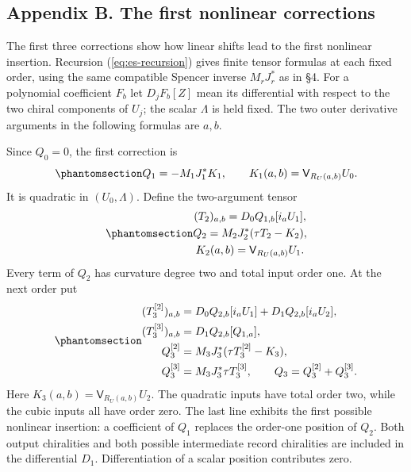 \documentclass[
  english,
  11pt,
  reqno]{amsart}
\begin{document}
\subsection{Appendix B. The first nonlinear
corrections}\label{appendix-b.-the-first-nonlinear-corrections}

The first three corrections show how linear shifts lead to the first
nonlinear insertion. Recursion (\ref{eq:es-recursion}) gives finite
tensor formulas at each fixed order, using the same compatible Spencer
inverse \(M_rJ_r^*\) as in §4. For a polynomial coefficient \(F_b\) let
\(D_jF_b[Z]\) mean its differential with respect to the two chiral
components of \(U_j\); the scalar \(\Lambda\) is held fixed. The two
outer derivative arguments in the following formulas are \(a,b\).

Since \(Q_0=0\), the first correction is
\begin{equation}\protect\phantomsection\label{eq:es-q-one}{
 Q_1=-M_1J_1^*K_1,\qquad
 K_1(a,b)=\mathsf V_{R_U(a,b)}U_0.
}\end{equation} It is quadratic in \((U_0,\Lambda)\). Define the
two-argument tensor
\begin{equation}\protect\phantomsection\label{eq:es-q-two}{\begin{gathered}
(T_2)_{a,b}=D_0Q_{1,b}[i_aU_1], \\
Q_2=M_2J_2^*(\tau T_2-K_2), \\
K_2(a,b)=\mathsf V_{R_U(a,b)}U_1.
\end{gathered}}\end{equation} Every term of \(Q_2\) has curvature degree two and total
input order one. At the next order put
\begin{equation}\protect\phantomsection\label{eq:es-q-three}{
 \begin{aligned}
 (T_3^{[2]})_{a,b}
     &=D_0Q_{2,b}[i_aU_1]+D_1Q_{2,b}[i_aU_2],\\
 (T_3^{[3]})_{a,b}
     &=D_1Q_{2,b}[Q_{1,a}],\\
 Q_3^{[2]}&=M_3J_3^*(\tau T_3^{[2]}-K_3),\\
 Q_3^{[3]}&=M_3J_3^*\tau T_3^{[3]},\qquad
 Q_3=Q_3^{[2]}+Q_3^{[3]}.
 \end{aligned}
}\end{equation} Here \(K_3(a,b)=\mathsf V_{R_U(a,b)}U_2\). The quadratic
inputs have total order two, while the cubic inputs all have order zero.
The last line exhibits the first possible nonlinear insertion: a
coefficient of \(Q_1\) replaces the order-one position of \(Q_2\). Both
output chiralities and both possible intermediate record chiralities are
included in the differential \(D_1\). Differentiation of a scalar
position contributes zero.
\end{document}
